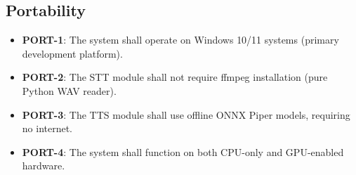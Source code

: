 \subsection{Portability}
\begin{itemize}
    \item \textbf{PORT-1}: The system shall operate on Windows 10/11 systems (primary development platform).
    \item \textbf{PORT-2}: The STT module shall not require ffmpeg installation (pure Python WAV reader).
    \item \textbf{PORT-3}: The TTS module shall use offline ONNX Piper models, requiring no internet.
    \item \textbf{PORT-4}: The system shall function on both CPU-only and GPU-enabled hardware.
\end{itemize}
